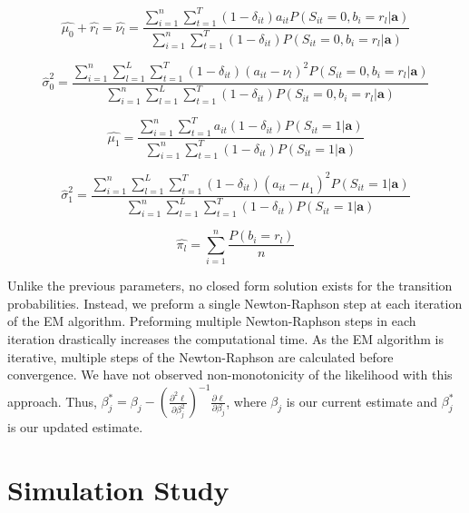\documentclass{article}
\begin{document}
\begin{equation}\label{mu0}
    \hat{\mu_0} + \hat{r_l} = \hat{\nu_l} = 
    \frac{\sum_{i=1}^n \sum_{t=1}^T (1-\delta_{it})a_{it}P(S_{it}=0,b_{i}=r_l|\textbf{a})}
    {\sum_{i=1}^n \sum_{t=1}^T (1-\delta_{it})P(S_{it}=0,b_{i}=r_l|\textbf{a})}
\end{equation} 

\begin{equation}\label{sig0}
    \hat{\sigma}_0^2 = 
    \frac{\sum_{i=1}^n \sum_{l=1}^L \sum_{t=1}^T (1-\delta_{it})(a_{it}-\nu_l)^2 P(S_{it}=0,b_{i}=r_l|\textbf{a})}
        {\sum_{i=1}^n \sum_{l=1}^L \sum_{t=1}^T (1-\delta_{it}) P(S_{it}=0,b_{i}=r_l|\textbf{a})}
\end{equation} 

\begin{equation}\label{mu1}
    \hat{\mu_1} = 
    \frac{\sum_{i=1}^n \sum_{t=1}^T a_{it}(1-\delta_{it})P(S_{it}=1|\textbf{a})}
        {\sum_{i=1}^n \sum_{t=1}^T (1-\delta_{it})P(S_{it}=1|\textbf{a})}
\end{equation} 

\begin{equation}\label{sig1}
    \hat{\sigma}_1^2 = 
    \frac{\sum_{i=1}^n \sum_{l=1}^L \sum_{t=1}^T (1-\delta_{it})(a_{it}-\mu_1)^2 P(S_{it}=1|\textbf{a})}
        {\sum_{i=1}^n \sum_{l=1}^L \sum_{t=1}^T (1-\delta_{it}) P(S_{it}=1|\textbf{a})}
\end{equation} 

\begin{equation}\label{pi}
    \hat{\pi_l} = \sum_{i = 1}^n \frac{P(b_i = r_l)}{n}
\end{equation}


Unlike the previous parameters, no closed form solution exists for the transition probabilities. Instead, we preform a single Newton-Raphson step at each iteration of the EM algorithm. Preforming multiple Newton-Raphson steps in each iteration drastically increases the computational time. As the EM algorithm is iterative, multiple steps of the Newton-Raphson are calculated before convergence. We have not observed non-monotonicity of the likelihood with this approach. Thus, $\beta_{j}^* = \beta_{j} - (\frac{\partial^2\ell}{\partial \beta_{j}^2})^{-1} \frac{\partial\ell}{\partial \beta_{j}}$, where $\beta_{j}$ is our current estimate and $\beta_{j}^*$ is our updated estimate. 

\newpage

\section{Simulation Study}\label{SimStudy}
\end{document}
